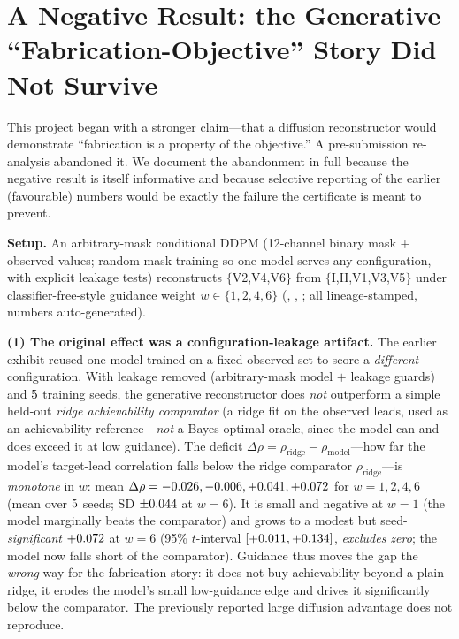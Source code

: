 \section{A Negative Result: the Generative ``Fabrication-Objective'' Story Did Not Survive}
\label{sec:generative}
This project began with a stronger claim---that a diffusion reconstructor would demonstrate
``fabrication is a property of the objective.'' A pre-submission re-analysis abandoned it. We document the abandonment in full because the negative result is
itself informative and because selective reporting of the earlier (favourable) numbers would
be exactly the failure the certificate is meant to prevent.

\textbf{Setup.} An arbitrary-mask conditional DDPM (12-channel binary mask $+$ observed values;
random-mask training so one model serves any configuration, with explicit leakage tests)
reconstructs $\{$V2,V4,V6$\}$ from $\{$I,II,V1,V3,V5$\}$ under classifier-free-style guidance
weight $w\in\{1,2,4,6\}$ (,
, ; all lineage-stamped, numbers
auto-generated).

\textbf{(1) The original effect was a configuration-leakage artifact.} The earlier exhibit
reused one model trained on a fixed observed set to score a \emph{different} configuration.
With leakage removed (arbitrary-mask model $+$ leakage guards) and $5$ training seeds,
the generative reconstructor does \emph{not} outperform a simple held-out \emph{ridge
achievability comparator} (a ridge fit on the observed leads, used as an achievability
reference---\emph{not} a Bayes-optimal oracle, since the model can and does exceed it at low
guidance). The deficit $\Delta\rho=\rho_{\text{ridge}}-\rho_{\text{model}}$---how far the model's
target-lead correlation falls below the ridge comparator $\rho_{\text{ridge}}$---is
\emph{monotone} in $w$: mean $\Delta\rho=-0.026,-0.006,+0.041,+0.072$ for
$w=1,2,4,6$ (mean over $5$ seeds; SD $\pm0.044$ at $w{=}6$). It is small and
negative at $w{=}1$ (the model marginally beats the comparator) and grows to a modest but
seed-\emph{significant} $+0.072$ at $w{=}6$ (95\% $t$-interval $[+0.011,+0.134]$,
\emph{excludes zero}; the model now falls short of the comparator). Guidance thus moves the gap
the \emph{wrong} way for the fabrication story: it does not buy achievability beyond a plain
ridge, it erodes the model's small low-guidance edge and drives it significantly below the
comparator. The previously reported large diffusion advantage does not reproduce.

